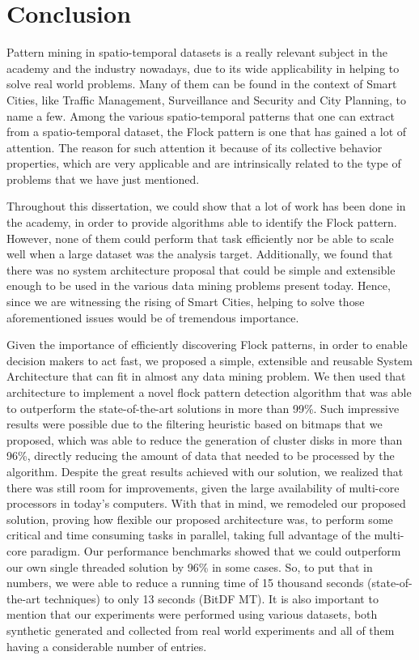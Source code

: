 \chapter{Conclusion}
\label{chp:conclusion}
Pattern mining in spatio-temporal datasets is a really relevant subject in the academy and the industry nowadays, due
to its wide applicability in helping to solve real world problems. Many of them can be found in the context of Smart
Cities, like Traffic Management, Surveillance and Security and City Planning, to name a few. Among the various
spatio-temporal patterns that one can extract from a spatio-temporal dataset, the Flock pattern is one that has gained a
lot of attention. The reason for such attention it because of its collective behavior properties, which are very
applicable and are intrinsically related to the type of problems that we have just mentioned.

Throughout this dissertation, we could show that a lot of work has been done in the academy, in order to provide
algorithms able to identify the Flock pattern. However, none of them could perform that task efficiently nor be able to
scale well when a large dataset was the analysis target. Additionally, we found that there was no system architecture
proposal that could be simple and extensible enough to be used in the various data mining problems present today. Hence,
since we are witnessing the rising of Smart Cities, helping to solve those aforementioned issues would be of tremendous
importance.

Given the importance of efficiently discovering Flock patterns, in order to enable decision makers to act fast, we
proposed a simple, extensible and reusable System Architecture that can fit in almost any data mining problem. We then
used that architecture to implement a novel flock pattern detection algorithm that was able to outperform the
state-of-the-art solutions in more than 99\%. Such impressive results were possible due to the filtering heuristic based
on bitmaps that we proposed, which was able to reduce the generation of cluster disks in more than 96\%, directly
reducing the amount of data that needed to be processed by the algorithm. Despite the great results achieved with our
solution, we realized that there was still room for improvements, given the large availability of multi-core processors
in today's computers. With that in mind, we remodeled our proposed solution, proving how flexible our proposed
architecture was, to perform some critical and time consuming tasks in parallel, taking full advantage of the multi-core
paradigm. Our performance benchmarks showed that we could outperform our own single threaded solution by 96\% in some
cases. So, to put that in numbers, we were able to reduce a running time of 15 thousand seconds (state-of-the-art
techniques) to only 13 seconds (BitDF MT). It is also important to mention that our experiments were performed using
various datasets, both synthetic generated and collected from real world experiments and all of them having a
considerable number of entries.

